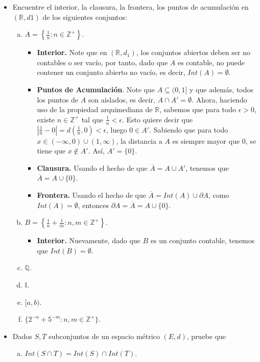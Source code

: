 \begin{itemize}[leftmargin=*]
    \item Encuentre el interior, la clausura, la frontera, los puntos de acumulación en $(\mathbb{R}, d1)$ de los siguientes conjuntos:
    \begin{enumerate}[a)]
        \item $\displaystyle A=\left\{\frac{1}{n}:n \in \mathbb{Z}^+\right\}$.
        \begin{solution}
            \begin{itemize}
                \item \textbf{Interior.} Note que en $(\mathbb{R},d_1)$, los conjuntos abiertos deben ser no contables o ser vacío, por tanto, dado que $A$ es contable, no puede contener un conjunto abierto no vacío, es decir, $Int(A)=\emptyset$.
                \item \textbf{Puntos de Acumulación}. Note que $A \subseteq (0,1]$ y que además, todos los puntos de $A$ son aislados, es decir, $A \cap A'= \emptyset$. Ahora, haciendo uso de la propiedad arquimediana de $\mathbb{R}$, sabemos que para todo $\epsilon>0$, existe $n \in \mathbb{Z}^+$ tal que $\displaystyle \frac{1}{n}<\epsilon$. Esto quiere decir que $\displaystyle \left| \frac{1}{n}-0\right|=d\left(\frac{1}{n},0\right)<\epsilon$, luego $0 \in A'$. Sabiendo que para todo $x \in (-\infty,0)\cup (1,\infty)$, la distancia a $A$ es siempre mayor que $0$, se tiene que $x\notin A'$. Así, $A'=\{0\}$.
                \item \textbf{Clausura.} Usando el hecho de que $\overline{A}=A\cup A'$, tenemos que $\overline{A}=A\cup \{0\}$.
                \item \textbf{Frontera.} Usando el hecho de que $\overline{A}=Int(A)\cup \partial A$, como $Int(A)=\emptyset$, entonces $\partial A=\overline{A}=A\cup \{0\}$.
            \end{itemize}
        \end{solution}
        \item $\displaystyle B=\left\{\frac{1}{n}+\frac{1}{m}:n,m \in \mathbb{Z}^+\right\}$.
        \begin{solution}
            \begin{itemize}
                \item \textbf{Interior.} Nuevamente, dado que $B$ es un conjunto contable, tenemos que $Int(B)=\emptyset$.
            \end{itemize}
        \end{solution}
        \item $\mathbb{Q}$.
        \item $\mathbb{I}$.
        \item $[a,b)$.
        \item $\{2^{-n}+5^{-m}:n,m \in \mathbb{Z}^+\}$.
    \end{enumerate}
    \item Dados $S,T$ subconjuntos de un espacio métrico $(E,d)$, pruebe que 
    \begin{enumerate}[a)]
        \item $Int(S\cap T)=Int(S)\cap Int(T)$.\\


\end{enumerate}
\end{itemize}
